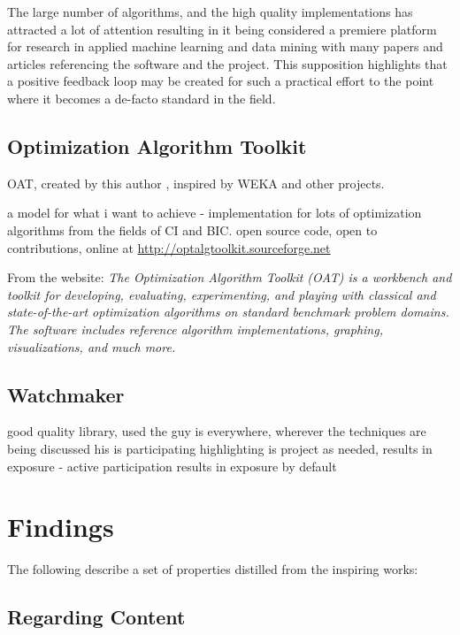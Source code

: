 \documentclass[a4paper, 11pt]{article}
\begin{document}
The large number of algorithms, and the high quality implementations has attracted a lot of attention resulting in it being considered a premiere platform for research in applied machine learning and data mining with many papers and articles referencing the software and the project. This supposition highlights that a positive feedback loop may be created for such a practical effort to the point where it becomes a de-facto standard in the field.

% 
% 
\subsection{Optimization Algorithm Toolkit}
OAT, created by this author \cite{Brownlee2007}, inspired by WEKA and other projects.

a model for what i want to achieve - implementation for lots of optimization algorithms from the fields of CI and BIC. open source code, open to contributions, online at \url{http://optalgtoolkit.sourceforge.net}

From the website: 
\emph{The Optimization Algorithm Toolkit (OAT) is a workbench and toolkit for developing, evaluating, experimenting, and playing with classical and state-of-the-art optimization algorithms on standard benchmark problem domains. The software includes reference algorithm implementations, graphing, visualizations, and much more.}


% 
% 
\subsection{Watchmaker}

good quality library, used
the guy is everywhere, wherever the techniques are being discussed his is participating
highlighting is project as needed, results in exposure - active participation results in exposure by default


% 
% 
\section{Findings}
\label{sec:findings}

The following describe a set of properties distilled from the inspiring works:

\subsection{Regarding Content}
\end{document}

